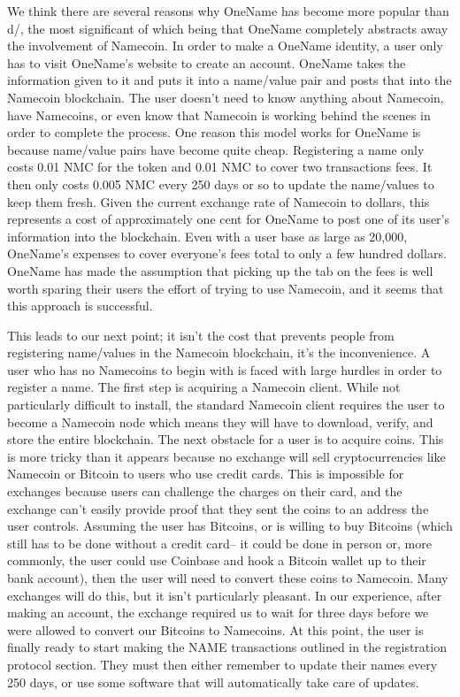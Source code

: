 We think there are several reasons why OneName has become more popular than d/, the most significant of which being that OneName completely abstracts away the involvement of Namecoin. In order to make a OneName identity, a user only has to visit OneName's website to create an account. OneName takes the information given to it and puts it into a name/value pair and posts that into the Namecoin blockchain. The user doesn't need to know anything about Namecoin, have Namecoins, or even know that Namecoin is working behind the scenes in order to complete the process. One reason this model works for OneName is because name/value pairs have become quite cheap. Registering a name only costs 0.01 NMC for the token and 0.01 NMC to cover two transactions fees. It then only costs 0.005 NMC every 250 days or so to update the name/values to keep them fresh. Given the current exchange rate of Namecoin to dollars, this represents a cost of approximately one cent for OneName to post one of its user's information into the blockchain. Even with a user base as large as 20,000, OneName's expenses to cover everyone's fees total to only a few hundred dollars. OneName has made the assumption that picking up the tab on the fees is well worth sparing their users the effort of trying to use Namecoin, and it seems that this approach is successful.

This leads to our next point; it isn't the cost that prevents people from registering name/values in the Namecoin blockchain, it's the inconvenience. A user who has no Namecoins to begin with is faced with large hurdles in order to register a name. The first step is acquiring a Namecoin client. While not particularly difficult to install, the standard Namecoin client requires the user to become a Namecoin node which means they will have to download, verify, and store the entire blockchain. The next obstacle for a user is to acquire coins. This is more tricky than it appears because no exchange will sell cryptocurrencies like Namecoin or Bitcoin to users who use credit cards. This is impossible for exchanges because users can challenge the charges on their card, and the exchange can't easily provide proof that they sent the coins to an address the user controls. Assuming the user has Bitcoins, or is willing to buy Bitcoins (which still has to be done without a credit card-- it could be done in person or, more commonly, the user could use Coinbase and hook a Bitcoin wallet up to their bank account), then the user will need to convert these coins to Namecoin. Many exchanges will do this, but it isn't particularly pleasant. In our experience, after making an account, the exchange required us to wait for three days before we were allowed to convert our Bitcoins to Namecoins. At this point, the user is finally ready to start making the NAME transactions outlined in the registration protocol section. They must then either remember to update their names every 250 days, or use some software that will automatically take care of updates.

